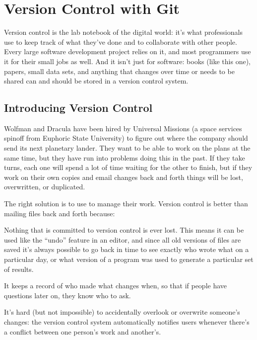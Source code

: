 \documentclass{book}
\begin{document}
\chapter{Version Control with Git}\label{s:git}

Version control is the lab notebook of the digital world: it's what
professionals use to keep track of what they've done and to collaborate
with other people. Every large software development project relies on
it, and most programmers use it for their small jobs as well. And it
isn't just for software: books (like this one), papers, small data sets,
and anything that changes over time or needs to be shared can and should
be stored in a version control system.

\section{Introducing Version Control}

Wolfman and Dracula have been hired by Universal Missions (a space
services spinoff from Euphoric State University) to figure out where the
company should send its next planetary lander. They want to be able to
work on the plans at the same time, but they have run into problems
doing this in the past. If they take turns, each one will spend a lot of
time waiting for the other to finish, but if they work on their own
copies and email changes back and forth things will be lost,
overwritten, or duplicated.

The right solution is to use  to manage their work. Version control is better than mailing
files back and forth because:

\begin{swcitemize}
\item
  Nothing that is committed to version control is ever lost. This means
  it can be used like the ``undo'' feature in an editor, and since all
  old versions of files are saved it's always possible to go back in
  time to see exactly who wrote what on a particular day, or what
  version of a program was used to generate a particular set of results.
\item
  It keeps a record of who made what changes when, so that if people
  have questions later on, they know who to ask.
\item
  It's hard (but not impossible) to accidentally overlook or overwrite
  someone's changes: the version control system automatically notifies
  users whenever there's a conflict between one person's work and
  another's.
\end{swcitemize}
\end{document}
